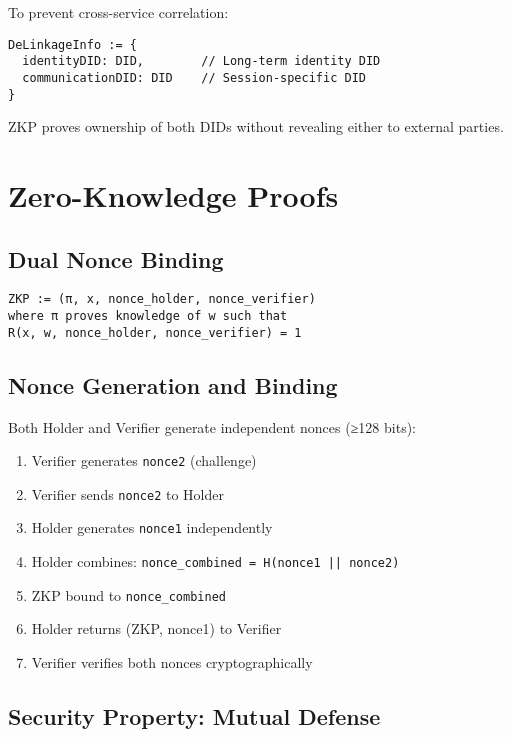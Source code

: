 To prevent cross-service correlation:

\begin{verbatim}
DeLinkageInfo := {
  identityDID: DID,        // Long-term identity DID
  communicationDID: DID    // Session-specific DID
}
\end{verbatim}

ZKP proves ownership of both DIDs without revealing either to external parties.

\section{Zero-Knowledge Proofs}

\subsection{Dual Nonce Binding}

\begin{verbatim}
ZKP := (π, x, nonce_holder, nonce_verifier)
where π proves knowledge of w such that
R(x, w, nonce_holder, nonce_verifier) = 1
\end{verbatim}

\subsection{Nonce Generation and Binding}

Both Holder and Verifier generate independent nonces (≥128 bits):

\begin{enumerate}
  \item Verifier generates \texttt{nonce2} (challenge)
  \item Verifier sends \texttt{nonce2} to Holder
  \item Holder generates \texttt{nonce1} independently
  \item Holder combines: \texttt{nonce\_combined = H(nonce1 || nonce2)}
  \item ZKP bound to \texttt{nonce\_combined}
  \item Holder returns (ZKP, nonce1) to Verifier
  \item Verifier verifies both nonces cryptographically
\end{enumerate}

\subsection{Security Property: Mutual Defense}

